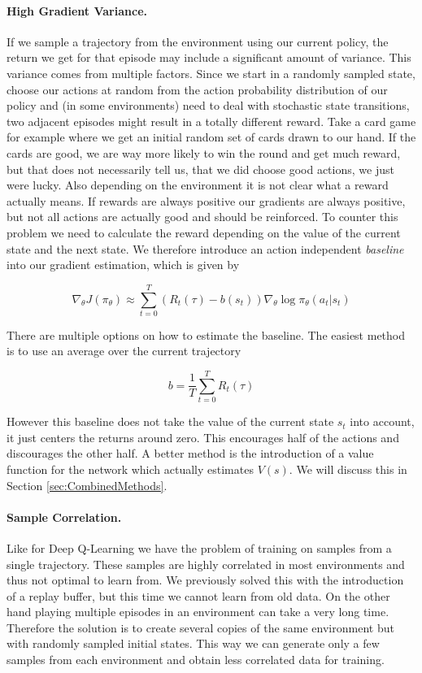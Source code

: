 \paragraph{High Gradient Variance.}
If we sample a trajectory from the environment using our current policy, the return we get for that episode may include a significant amount of variance. This variance comes from multiple factors. Since we start in a randomly sampled state, choose our actions at random from the action probability distribution of our policy and (in some environments) need to deal with stochastic state transitions, two adjacent episodes might result in a totally different reward. Take a card game for example where we get an initial random set of cards drawn to our hand. If the cards are good, we are way more likely to win the round and get much reward, but that does not necessarily tell us, that we did choose good actions, we just were lucky. Also depending on the environment it is not clear what a reward actually means. If rewards are always positive our gradients are always positive, but not all actions are actually good and should be reinforced. To counter this problem we need to calculate the reward depending on the value of the current state and the next state. We therefore introduce an action independent \textit{baseline} into our gradient estimation, which is given by 

\[\nabla_\theta J(\pi_\theta) \approx \sum^T_{t=0}(R_t(\tau) - b(s_t)) \nabla_\theta \log \pi_\theta(a_t|s_t)\]

There are multiple options on how to estimate the baseline. The easiest method is to use an average over the current trajectory

\[b = \frac{1}{T} \sum^T_{t=0}R_t(\tau)\]

However this baseline does not take the value of the current state $s_t$ into account, it just centers the returns around zero. This encourages half of the actions and discourages the other half. A better method is the introduction of a value function for the network which actually estimates $V(s)$. We will discuss this in Section \ref{sec:CombinedMethods}.

\paragraph{Sample Correlation.}
Like for Deep Q-Learning we have the problem of training on samples from a single trajectory. These samples are highly correlated in most environments and thus not optimal to learn from. We previously solved this with the introduction of a replay buffer, but this time we cannot learn from old data. On the other hand playing multiple episodes in an environment can take a very long time. Therefore the solution is to create several copies of the same environment but with randomly sampled initial states. This way we can generate only a few samples from each environment and obtain less correlated data for training.


